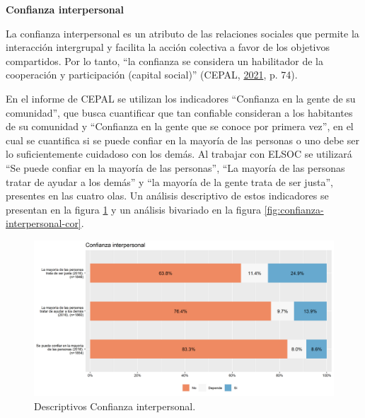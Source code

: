 \documentclass[
  12pt,
]{book}
\begin{document}
\textbf{Confianza interpersonal}

La confianza interpersonal es un atributo de las relaciones sociales que permite la interacción intergrupal y facilita la acción colectiva a favor de los objetivos compartidos. Por lo tanto, ``la confianza se considera un habilitador de la cooperación y participación (capital social)'' (CEPAL, \protect\hyperlink{ref-cepal_Cohesion_2021}{2021}, p. 74).

En el informe de CEPAL se utilizan los indicadores ``Confianza en la gente de su comunidad'', que busca cuantificar que tan confiable consideran a los habitantes de su comunidad y ``Confianza en la gente que se conoce por primera vez'', en el cual se cuantifica si se puede confiar en la mayoría de las personas o uno debe ser lo suficientemente cuidadoso con los demás. Al trabajar con ELSOC se utilizará ``Se puede confiar en la mayoría de las personas'', ``La mayoría de las personas tratar de ayudar a los demás'' y ``la mayoría de la gente trata de ser justa'', presentes en las cuatro olas. Un análisis descriptivo de estos indicadores se presentan en la figura \ref{fig:confianza-interpersonal} y un análisis bivariado en la figura \ref{fig:confianza-interpersonal-cor}.

\begin{figure}[H]

{\centering \includegraphics[width=1\linewidth,height=1\textheight]{output/graphs/confianza-interpersonal} 

}

\caption{Descriptivos Confianza interpersonal.}\label{fig:confianza-interpersonal}
\end{figure}
\end{document}
